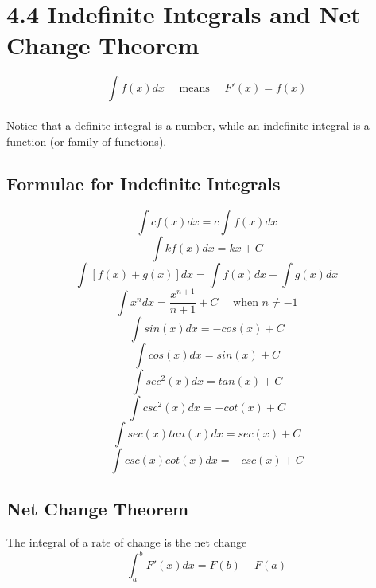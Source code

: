 %
%

\section*{4.4 Indefinite Integrals and Net Change Theorem}

$$ \int f(x)dx \quad \text{ means } \quad F'(x)=f(x) $$
\\
Notice that a definite integral is a number, while an indefinite integral is a function (or family of functions).

\subsection*{Formulae for Indefinite Integrals}

$$ \int cf(x)dx = c \int f(x)dx $$
$$ \int kf(x)dx = kx + C $$
$$ \int [f(x) +  g(x)]dx = \int f(x)dx + \int g(x)dx $$
$$ \int x^n dx = \frac{x^{n+1}}{n+1} + C \quad \text{ when } n \neq -1 $$
$$ \int sin(x)dx = -cos(x) + C $$
$$ \int cos(x)dx = sin(x) + C $$
$$ \int sec^2(x)dx = tan(x) + C $$
$$ \int csc^2(x)dx = -cot(x) + C $$
$$ \int sec(x)tan(x)dx = sec(x) + C $$
$$ \int csc(x)cot(x)dx = -csc(x) + C $$

\subsection*{Net Change Theorem}

The integral of a rate of change is the net change
$$ \int_a^b F'(x)dx = F(b) - F(a) $$



